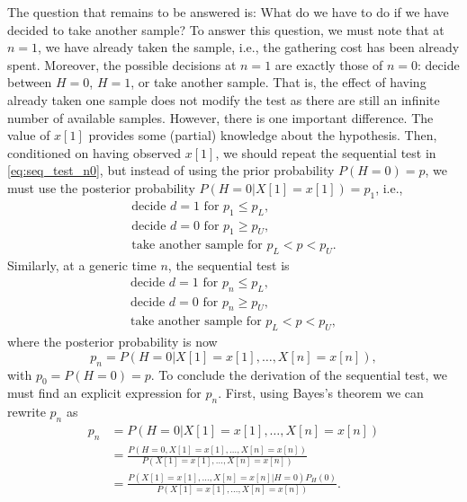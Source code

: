 The question that remains to be answered is: What do we have to do if we have decided to take another sample? To answer this question, we must note that at $n = 1$, we have already taken the sample, i.e., the gathering cost has been already spent. Moreover, the possible decisions at $n = 1$ are exactly those of $n = 0$: decide between $H = 0$, $H = 1$, or take another sample. That is, the effect of having already taken one sample does not modify the test as there are still an infinite number of available samples. However, there is one important difference. The value of $x[1]$ provides some (partial) knowledge about the hypothesis. Then, conditioned on having observed $x[1]$, we should repeat the sequential test in \eqref{eq:seq_test_n0}, but instead of using the prior probability $P(H = 0) = p$, we must use the posterior probability $P(H = 0 | X[1] = x[1]) = p_1$, i.e.,
\begin{equation*}
	\begin{array}{l}
		\text{decide } d = 1 \text{ for } p_1 \leq p_L, \\
		\text{decide } d = 0 \text{ for } p_1 \geq p_U, \\
		\text{take another sample for } p_L < p < p_U.
	\end{array}
\end{equation*}
Similarly, at a generic time $n$, the sequential test is
\begin{equation}
	\label{eq:seq_test}
	\begin{array}{l}
		\text{decide } d = 1 \text{ for } p_n \leq p_L, \\
		\text{decide } d = 0 \text{ for } p_n \geq p_U, \\
		\text{take another sample for } p_L < p < p_U,
	\end{array}
\end{equation}
where the posterior probability is now
\begin{equation*}
	p_n = P(H = 0 | X[1] = x[1], \ldots, X[n] = x[n]),
\end{equation*}
with $p_0 = P(H = 0) = p$. To conclude the derivation of the sequential test, we must find an explicit expression for $p_n$. First, using Bayes's theorem we can rewrite $p_n$ as
\begin{align*}
	p_n &= P(H = 0 | X[1] = x[1], \ldots, X[n] = x[n]) \\ &= \frac{P(H = 0 , X[1] = x[1], \ldots, X[n] = x[n])}{P(X[1] = x[1], \ldots, X[n] = x[n])} \\ &= \frac{P(X[1] = x[1], \ldots, X[n] = x[n] | H = 0) P_H(0)}{P(X[1] = x[1], \ldots, X[n] = x[n])}.
\end{align*}
